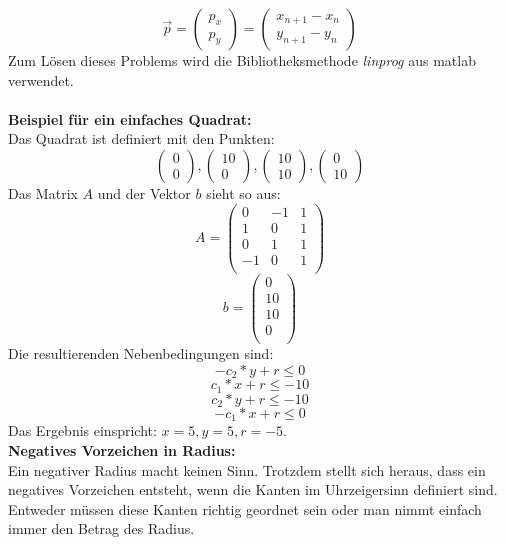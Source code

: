 \documentclass[conference]{IEEEtran}
\begin{document}
	\[ \vec{p} =  \left(\begin{array}{c}p_x\\p_y\end{array}\right) = \left(\begin{array}{c}x_{n+1} - x_n\\y_{n+1} - y_n\end{array}\right) \]
	Zum Lösen dieses Problems wird die Bibliotheksmethode \textit{linprog} aus matlab verwendet.\\
	\\
	\textbf{Beispiel für ein einfaches Quadrat:}\\
	Das Quadrat ist definiert mit den Punkten:
	\[\left(\begin{array}{c}0\\0\end{array}\right) , \left(\begin{array}{c}10\\0\end{array}\right),\left(\begin{array}{c}10\\10\end{array}\right),\left(\begin{array}{c}0\\10\end{array}\right)\]
	Das Matrix $A$ und der Vektor $b$ sieht so aus:
	\[A = \begin{pmatrix}
		0 & -1 & 1 \\
		1 & 0 & 1 \\
		0 & 1 & 1 \\
		-1 & 0 & 1 \\
	\end{pmatrix}\]
	\[b = \begin{pmatrix}
		0 \\
		10\\
		10\\
		0\\
	\end{pmatrix}\]
	Die resultierenden Nebenbedingungen sind:
	\[ -c_2*y+r \leq 0 \]
	\[ c_1*x+r \leq -10 \]
	\[ c_2*y+r \leq -10 \]
	\[ -c_1*x+r \leq 0 \]
	 Das Ergebnis einspricht: $x = 5, y = 5, r = -5$.\\
	 \textbf{Negatives Vorzeichen in Radius:}\\
	 Ein negativer Radius macht keinen Sinn. Trotzdem stellt sich heraus, dass ein negatives Vorzeichen entsteht, wenn die Kanten im Uhrzeigersinn definiert sind. Entweder müssen diese Kanten richtig geordnet sein oder man nimmt einfach immer den Betrag des Radius.\\
\end{document}
